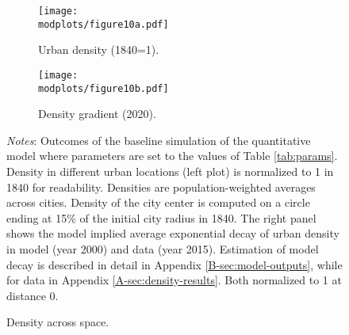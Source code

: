 \documentclass[./20250130-paper.tex]{subfiles}
\begin{document}
\begin{figure}[hpb]
	\begin{adjustbox}{center}	
		\begin{subfigure}{\ptwo\textwidth}
			\texttt{[image: \\modplots/figure10a.pdf]}
			\caption{Urban density (1840=1).\label{fig:model-density2}}
		\end{subfigure}
		\hspace{0.1cm}
		\begin{subfigure}{\ptwo\textwidth}
			\texttt{[image: \\modplots/figure10b.pdf]}
			\caption{Density gradient (2020).\label{fig:model-gradient}}
		\end{subfigure}	
	\end{adjustbox}		
	\caption{Density across space.\label{fig:model-densityspace}}
	{\footnotesize \textit{Notes}: Outcomes of the baseline simulation of the quantitative model where parameters are set to the values of Table \ref{tab:params}. Density in different urban locations (left plot) is normalized to 1 in 1840 for readability. Densities are population-weighted averages across cities. Density of the city center is computed on a circle ending at 15\% of the initial city radius in 1840. The right panel shows the model implied average exponential decay of urban density in model (year 2000) and data (year 2015). Estimation of model decay is described in detail in Appendix \ref{B-sec:model-outputs}, while for data in Appendix \ref{A-sec:density-results}. Both normalized to 1 at distance 0.}
\end{figure}
\end{document}
